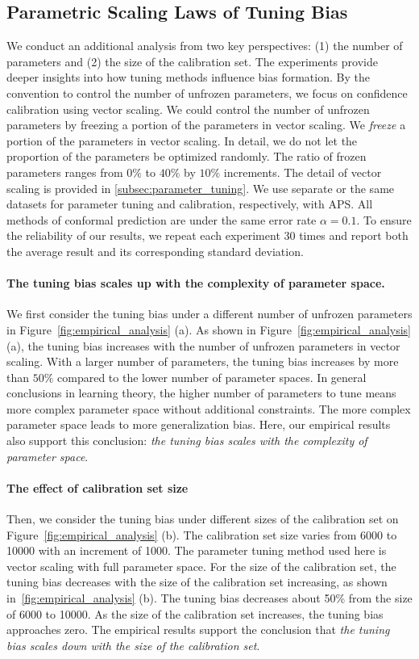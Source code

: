 \documentclass{article}
\newcommand{\1}{\mathbbm{1}}
\theoremstyle{plain}
\theoremstyle{definition}
\theoremstyle{remark}
\begin{document}
\subsection{Parametric Scaling Laws of Tuning Bias}
We conduct an additional analysis from two key perspectives: (1) the number of parameters and (2) the size of the calibration set. 
The experiments provide deeper insights into how tuning methods influence bias formation. 
By the convention to control the number of unfrozen parameters, we focus on confidence calibration using vector scaling.
We could control the number of unfrozen parameters by freezing a portion of the parameters in vector scaling. 
We \textit{freeze} a portion of the parameters in vector scaling. 
In detail, we do not let the proportion of the parameters be optimized randomly. 
The ratio of frozen parameters ranges from \(0\%\) to \(40\%\) by \(10\%\) increments. 
The detail of vector scaling is provided in \cref{subsec:parameter_tuning}. 
We use separate or the same datasets for parameter tuning and calibration, respectively, with APS.
All methods of conformal prediction are under the same error rate $\alpha=0.1$.
To ensure the reliability of our results, we repeat each experiment 30 times and report both the average result and its corresponding standard deviation. 

\paragraph{The tuning bias scales up with the complexity of parameter space.}
We first consider the tuning bias under a different number of unfrozen parameters in Figure~\ref{fig:empirical_analysis} (a).
As shown in Figure~\ref{fig:empirical_analysis} (a), the tuning bias increases with the number of unfrozen parameters in vector scaling. 
With a larger number of parameters, the tuning bias increases by more than \(50\%\) compared to the lower number of parameter spaces. 
In general conclusions in learning theory, the higher number of parameters to tune means more complex parameter space without additional constraints. 
The more complex parameter space leads to more generalization bias. 
Here, our empirical results also support this conclusion: \textit{the tuning bias scales with the complexity of parameter space}.

\paragraph{The effect of calibration set size}
Then, we consider the tuning bias under different sizes of the calibration set on Figure~\ref{fig:empirical_analysis} (b).
The calibration set size varies from 6000 to 10000 with an increment of 1000.
The parameter tuning method used here is vector scaling with full parameter space. 
For the size of the calibration set, the tuning bias decreases with the size of the calibration set increasing, as shown in~\cref{fig:empirical_analysis} (b).
The tuning bias decreases about 50\% from the size of 6000 to 10000.
As the size of the calibration set increases, the tuning bias approaches zero.
The empirical results support the conclusion that \textit{the tuning bias scales down with the size of the calibration set}.
\end{document}
